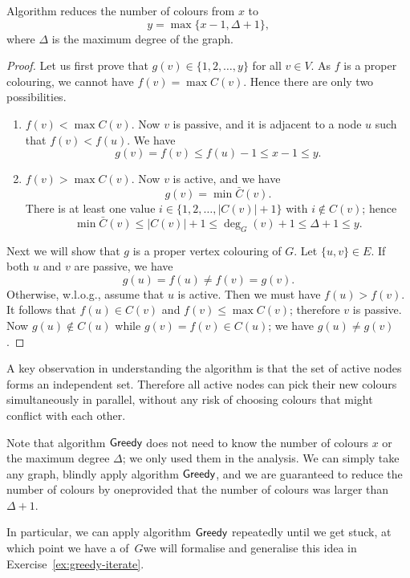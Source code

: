 \begin{lemma}
    Algorithm  reduces the number of colours from $x$ to
    \[
        y = \max \{ x-1, \Delta+1 \},
    \]
    where $\Delta$ is the maximum degree of the graph.
\end{lemma}
\begin{proof}
    Let us first prove that $g(v) \in \{1,2,\dotsc,y\}$ for all $v \in V$. As $f$ is a proper colouring, we cannot have $f(v) = \max C(v)$. Hence there are only two possibilities.
    \begin{enumerate}
        \item $f(v) < \max C(v)$. Now $v$ is passive, and it is adjacent to a node $u$ such that $f(v) < f(u)$. We have
        \[
            g(v) = f(v) \le f(u) - 1 \le x - 1 \le y.
        \]
        \item $f(v) > \max C(v)$. Now $v$ is active, and we have
        \[
            g(v) = \min \bar{C}(v).
        \]
        There is at least one value $i \in \{1,2,\dotsc,|C(v)|+1\}$ with $i \notin C(v)$; hence
        \[
            \min \bar{C}(v) \le |C(v)| + 1 \le \deg_G(v) + 1 \le \Delta + 1 \le y.
        \]
    \end{enumerate}
    
    Next we will show that $g$ is a proper vertex colouring of $G$. Let $\{u,v\} \in E$. If both $u$ and $v$ are passive, we have
    \[
        g(u) = f(u) \ne f(v) = g(v).
    \]
    Otherwise, w.l.o.g., assume that $u$ is active. Then we must have $f(u) > f(v)$. It follows that $f(u) \in C(v)$ and $f(v) \le \max C(v)$; therefore $v$ is passive. Now
    $g(u) \notin C(u)$ while
    $g(v) = f(v) \in C(u)$; we have $g(u) \ne g(v)$.
\end{proof}

A key observation in understanding the algorithm is that the set of active nodes forms an independent set. Therefore all active nodes can pick their new colours simultaneously in parallel, without any risk of choosing colours that might conflict with each other.

Note that algorithm $\textsf{Greedy}$ does not need to know the number of colours $x$ or the maximum degree $\Delta$; we only used them in the analysis. We can simply take any graph, blindly apply algorithm $\textsf{Greedy}$, and we are guaranteed to reduce the number of colours by one\mydash provided that the number of colours was larger than $\Delta + 1$.

In particular, we can apply algorithm $\textsf{Greedy}$ repeatedly until we get stuck, at which point we have a \Dpocol{} of~$G$\mydash we will formalise and generalise this idea in Exercise~\ref{ex:greedy-iterate}.

